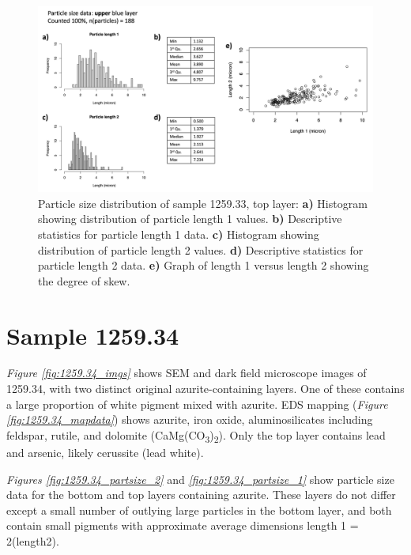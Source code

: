 \begin{figure}[H]
\centering
  \includegraphics[width=\linewidth]{1259-33_partsize_2}
\caption[Particle size distribution, sample 1259.33, top layer.]{Particle size distribution of sample 1259.33, top layer: \textbf{a)} Histogram showing distribution of particle length 1 values. \textbf{b)} Descriptive statistics for particle length 1 data. \textbf{c)} Histogram showing distribution of particle length 2 values. \textbf{d)} Descriptive statistics for particle length 2 data. \textbf{e)} Graph of length 1 versus length 2 showing the degree of skew.}
\label{fig:1259.33_partsize_2}
\end{figure}


\section{Sample 1259.34}

\textit{Figure \ref{fig:1259.34_imgs}} shows SEM and dark field microscope images of 1259.34, with two distinct original azurite-containing layers. One of these contains a large proportion of white pigment mixed with azurite. EDS mapping (\textit{Figure \ref{fig:1259.34_mapdata}}) shows azurite, iron oxide, aluminosilicates including feldspar, rutile, and dolomite (CaMg(CO\textsubscript{3})\textsubscript{2}). Only the top layer contains lead and arsenic, likely cerussite (lead white).

\textit{Figures \ref{fig:1259.34_partsize_2}} and \textit{\ref{fig:1259.34_partsize_1}} show particle size data for the bottom and top layers containing azurite. These layers do not differ except a small number of outlying large particles in the bottom layer, and both contain small pigments with approximate average dimensions length 1 = 2(length2). 

